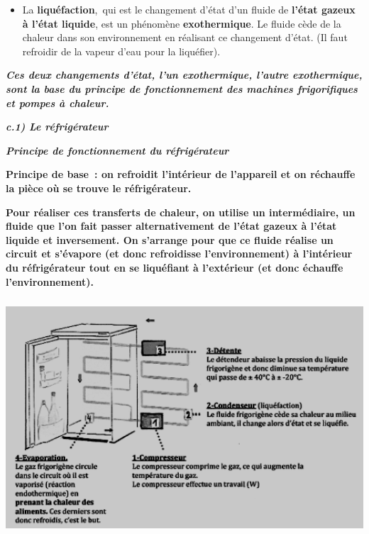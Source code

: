 \begin{itemize}
\tightlist
\item
  La \textbf{liquéfaction},~qui est le changement d'état d'un fluide de
  \textbf{l'état gazeux à l'état liquide}, est un phénomène
  \textbf{exothermique}. Le fluide cède de la chaleur dans son
  environnement en réalisant ce changement d'état. (Il faut refroidir de
  la vapeur d'eau pour la liquéfier).
\end{itemize}

\emph{\textbf{Ces deux changements d'état, l'un exothermique, l'autre
exothermique, sont la base du principe de fonctionnement des machines
frigorifiques et pompes à chaleur. }}

\textbf{}

\textbf{}

\textbf{}

\textbf{}

\textbf{}

\textbf{}

\textbf{}

\textbf{}

\textbf{}

\textbf{}

\textbf{}

\textbf{}

\textbf{\emph{\textbf{c.1) Le réfrigérateur }}}

\textbf{}

\textbf{\emph{\textbf{Principe de fonctionnement du réfrigérateur}}}

\textbf{\textbf{Principe de base~: on refroidit l'intérieur de
l'appareil et on réchauffe la pièce où se trouve le réfrigérateur. }}

\textbf{\textbf{Pour réaliser ces transferts de chaleur, on utilise un
intermédiaire, un fluide que l'on fait passer alternativement de l'état
gazeux à l'état liquide et inversement. On s'arrange pour que ce fluide
réalise un circuit et s'évapore (et donc refroidisse l'environnement) à
l'intérieur du réfrigérateur tout en se liquéfiant à l'extérieur (et
donc échauffe l'environnement). }}

\textbf{}

\includegraphics[width=14.263cm,height=8.848cm]{Pictures/10000001000001D50000012367CA7DC2A31818DF.png}\textbf{}

